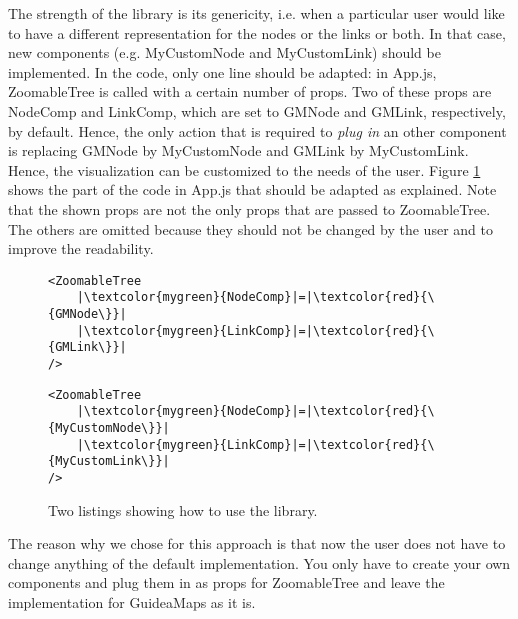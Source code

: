 The strength of the library is its genericity, i.e. when a particular user would like to have a different representation for the nodes or the links or both. In that case, new components (e.g. MyCustomNode and MyCustomLink) should be implemented. In the code, only one line should be adapted: in App.js, ZoomableTree is called with a certain number of props. Two of these props are NodeComp and LinkComp, which are set to GMNode and GMLink, respectively, by default. Hence, the only action that is required to \textit{plug in} an other component is replacing GMNode by MyCustomNode and GMLink by MyCustomLink. Hence, the visualization can be customized to the needs of the user. Figure \ref{fig:examplecode-library} shows the part of the code in App.js that should be adapted as explained. Note that the shown props are not the only props that are passed to ZoomableTree. The others are omitted because they should not be changed by the user and to improve the readability.

\begin{figure}[H]
	\begin{minipage}{0.5\textwidth}
 		 \centering
		 \begin{verbatim}
<ZoomableTree
    |\textcolor{mygreen}{NodeComp}|=|\textcolor{red}{\{GMNode\}}|
    |\textcolor{mygreen}{LinkComp}|=|\textcolor{red}{\{GMLink\}}|
/>
		\end{verbatim}
		\label{lst:default-components}
	\end{minipage}
 	\begin{minipage}{0.5\textwidth}
  		\centering
  		\begin{verbatim}
<ZoomableTree
    |\textcolor{mygreen}{NodeComp}|=|\textcolor{red}{\{MyCustomNode\}}|
    |\textcolor{mygreen}{LinkComp}|=|\textcolor{red}{\{MyCustomLink\}}|
/>
		\end{verbatim}
		\label{lst:custom-components}
 	\end{minipage}
	\caption{Two listings showing how to use the library.}
	\label{fig:examplecode-library}
\end{figure}

The reason why we chose for this approach is that now the user does not have to change anything of the default implementation. You only have to create your own components and plug them in as props for ZoomableTree and leave the implementation for GuideaMaps as it is.\\

